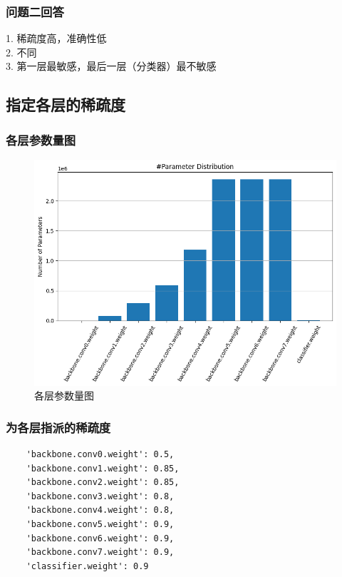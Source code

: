 \documentclass{article}
\begin{document}
\subsubsection{问题二回答}
 
1. 稀疏度高，准确性低  \\
2. 不同  \\
3. 第一层最敏感，最后一层（分类器）最不敏感  \\

\subsection{指定各层的稀疏度}

\subsubsection{各层参数量图}

\begin{figure}[H]
    \centering
    \includegraphics[width=1\textwidth]{output4.png}
    \caption{各层参数量图}
\end{figure}

\subsubsection{为各层指派的稀疏度}

\begin{verbatim}
    'backbone.conv0.weight': 0.5,
    'backbone.conv1.weight': 0.85,
    'backbone.conv2.weight': 0.85,
    'backbone.conv3.weight': 0.8,
    'backbone.conv4.weight': 0.8,
    'backbone.conv5.weight': 0.9,
    'backbone.conv6.weight': 0.9,
    'backbone.conv7.weight': 0.9,
    'classifier.weight': 0.9
\end{verbatim}
\end{document}
